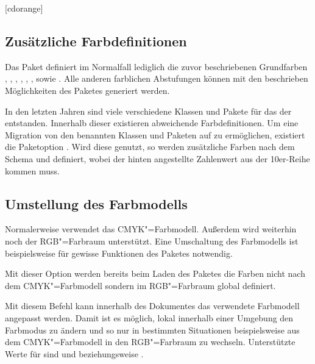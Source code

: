\begin{Declaration*}{}
\begin{Declaration}{[cdorange]}
\printdeclarationlist%
\end{Declaration}


\subsection{Zusätzliche Farbdefinitionen}
Das Paket  definiert im Normalfall lediglich die zuvor 
beschriebenen Grundfarben , , , 
, , ,  sowie 
. Alle anderen farblichen Abstufungen können mit den beschrieben 
Möglichkeiten des Paketes  generiert werden.

\begin{Declaration}{}
\printdeclarationlist%
%
In den letzten Jahren sind viele verschiedene Klassen und Pakete für das \CD 
der \TnUD entstanden. Innerhalb dieser existieren abweichende Farbdefinitionen. 
Um eine Migration von den benannten Klassen und Paketen auf \TUDScript zu 
ermöglichen, existiert die Paketoption . Wird diese genutzt, 
so werden zusätzliche Farben nach dem Schema  und 
 definiert, wobei der hinten angestellte Zahlenwert 
aus der 10er-Reihe kommen muss.
\end{Declaration}



\subsection{Umstellung des Farbmodells}
%
Normalerweise verwendet  das CMYK"=Farbmodell. Außerdem 
wird weiterhin noch der RGB"=Farbraum unterstützt. Eine Umschaltung des 
Farbmodells ist beispielsweise für gewisse Funktionen des Paketes 
 notwendig.

\begin{Declaration}{}
\printdeclarationlist%
%
Mit dieser Option werden bereits beim Laden des Paketes  
die Farben nicht nach dem CMYK"=Farbmodell sondern im RGB"=Farbraum global 
definiert.
\end{Declaration}

\begin{Declaration}{}
\printdeclarationlist%
%
Mit diesem Befehl kann innerhalb des Dokumentes das verwendete Farbmodell 
angepasst werden. Damit ist es möglich, lokal innerhalb einer Umgebung den 
Farbmodus zu ändern und so nur in bestimmten Situationen beispielsweise aus dem 
CMYK"=Farbmodell in den RGB"=Farbraum zu wechseln. Unterstützte Werte für 
 sind  und  beziehungsweise 
.
\end{Declaration}


\end{Declaration*}
